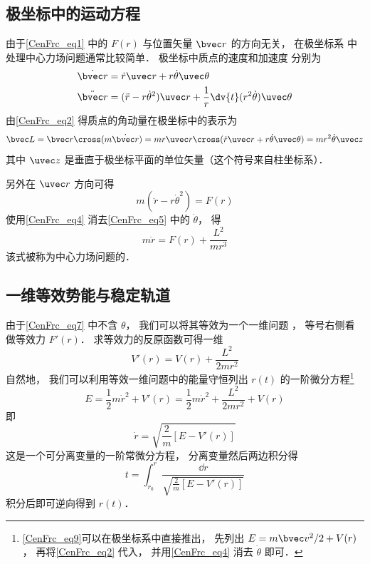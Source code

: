 \subsection{极坐标中的运动方程}
由于\autoref{CenFrc_eq1} 中的 $F(r)$ 与位置矢量 $\bvec r$ 的方向无关， 在极坐标系 中处理中心力场问题通常比较简单． 极坐标中质点的速度和加速度 分别为
\begin{align}
\dot{\bvec r} &= \dot r \uvec r + r\dot\theta\uvec\theta\label{CenFrc_eq2}\\
\ddot{\bvec r} &= (\ddot{r} - r \dot\theta^2)\uvec r + \frac 1r \dv{t} (r^2\dot\theta)\uvec \theta\label{CenFrc_eq3}
\end{align}
由\autoref{CenFrc_eq2} 得质点的角动量在极坐标中的表示为
\begin{equation}\label{CenFrc_eq4}
\bvec L = \bvec r \cross (m \dot{\bvec r})
= mr \uvec r \cross (\dot r \uvec r + r\dot\theta \uvec\theta)
= mr^2\dot \theta \uvec z
\end{equation}
其中 $\uvec z$ 是垂直于极坐标平面的单位矢量（这个符号来自柱坐标系）． 

另外在 $\uvec r$ 方向可得
\begin{equation}\label{CenFrc_eq5}
m(\ddot{r} - r \dot\theta^2) = F(r)
\end{equation}
使用\autoref{CenFrc_eq4} 消去\autoref{CenFrc_eq5} 中的 $\dot\theta$， 得
\begin{equation}\label{CenFrc_eq7}
m\ddot r = F(r) + \frac{L^2}{mr^3}
\end{equation}
该式被称为中心力场问题的．

\subsection{一维等效势能与稳定轨道}
由于\autoref{CenFrc_eq7} 中不含 $\theta$， 我们可以将其等效为一个一维问题%
， 等号右侧看做等效力 $F'(r)$． 求等效力的反原函数可得一维
\begin{equation}
V'(r) = V(r) + \frac{L^2}{2mr^2}
\end{equation}
自然地， 我们可以利用等效一维问题中的能量守恒列出 $r(t)$ 的一阶微分方程\footnote{\autoref{CenFrc_eq9}可以在极坐标系中直接推出， 先列出 $E = m\bvec v^2/2 + V(r)$， 再将\autoref{CenFrc_eq2} 代入， 并用\autoref{CenFrc_eq4} 消去 $\dot\theta$ 即可．}
\begin{equation}\label{CenFrc_eq9}
E = \frac 12 m\dot r^2 + V'(r) = \frac 12 m\dot r^2 + \frac{L^2}{2mr^2} + V(r)
\end{equation}
即
\begin{equation}
\dot r = \sqrt{\frac 2m [E - V'(r)]}
\end{equation}
这是一个可分离变量的一阶常微分方程， %
分离变量然后两边积分得
\begin{equation}
t = \int_{r_0}^{r} \frac{\dd{r}}{\sqrt{\frac 2m [E - V'(r)]}}
\end{equation}
积分后即可逆向得到 $r(t)$．

